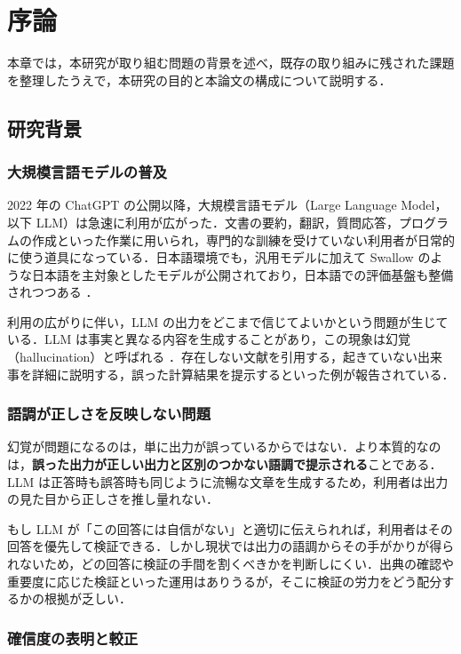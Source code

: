 \section{序論}

本章では，本研究が取り組む問題の背景を述べ，既存の取り組みに残された課題を整理したうえで，本研究の目的と本論文の構成について説明する．

\subsection{研究背景}

\subsubsection{大規模言語モデルの普及}

2022 年の ChatGPT の公開以降，大規模言語モデル（Large Language Model，以下 LLM）は急速に利用が広がった．文書の要約，翻訳，質問応答，プログラムの作成といった作業に用いられ，専門的な訓練を受けていない利用者が日常的に使う道具になっている．日本語環境でも，汎用モデルに加えて Swallow \cite{fujii2024swallow} のような日本語を主対象としたモデルが公開されており，日本語での評価基盤も整備されつつある \cite{llmjpeval2024}．

利用の広がりに伴い，LLM の出力をどこまで信じてよいかという問題が生じている．LLM は事実と異なる内容を生成することがあり，この現象は幻覚（hallucination）と呼ばれる \cite{ji2023hallucination,huang2023hallucination}．存在しない文献を引用する，起きていない出来事を詳細に説明する，誤った計算結果を提示するといった例が報告されている．

\subsubsection{語調が正しさを反映しない問題}

幻覚が問題になるのは，単に出力が誤っているからではない．より本質的なのは，\textbf{誤った出力が正しい出力と区別のつかない語調で提示される}ことである．LLM は正答時も誤答時も同じように流暢な文章を生成するため，利用者は出力の見た目から正しさを推し量れない．

もし LLM が「この回答には自信がない」と適切に伝えられれば，利用者はその回答を優先して検証できる．しかし現状では出力の語調からその手がかりが得られないため，どの回答に検証の手間を割くべきかを判断しにくい．出典の確認や重要度に応じた検証といった運用はありうるが，そこに検証の労力をどう配分するかの根拠が乏しい．

\subsubsection{確信度の表明と較正}

